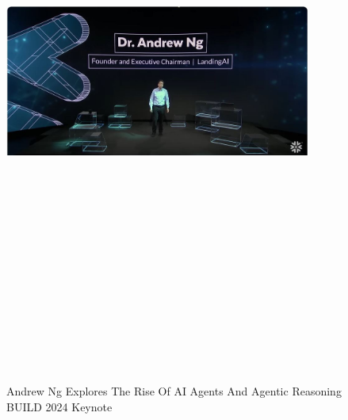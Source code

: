 \documentclass[a4paper,12pt]{article}
\begin{document}
\vspace{50pt} %
\begin{figure}[h]	\vspace{-5pt} %
	\centering
	\vspace{-10pt} %
	\includegraphics[width=0.9\textwidth, height=20cm, keepaspectratio]{../Talks Blogs/Andrew Ng Explores The Rise Of AI Agents And Agentic Reasoning BUILD 2024 Keynote}
	\vspace{-5pt} %
	\caption{Andrew Ng Explores The Rise Of AI Agents And Agentic Reasoning BUILD 2024 Keynote}
	\vspace{-10pt}
\end{figure}
\end{document}
